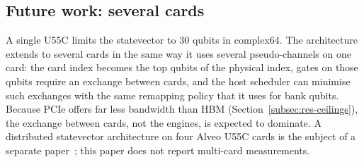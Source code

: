 \subsection{Future work: several cards}\label{subsec:future-multifpga}

A single U55C limits the statevector to 30 qubits in complex64. The architecture extends to several cards in the same way it uses several pseudo-channels on one card: the card index becomes the top qubits of the physical index, gates on those qubits require an exchange between cards, and the host scheduler can minimise such exchanges with the same remapping policy that it uses for bank qubits. Because PCIe offers far less bandwidth than HBM (Section~\ref{subsec:res-ceilings}), the exchange between cards, not the engines, is expected to dominate. A distributed statevector architecture on four Alveo U55C cards is the subject of a separate paper~\cite{ali2026multifpga}; this paper does not report multi-card measurements.
